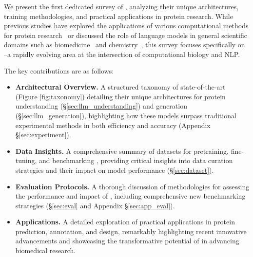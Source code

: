 We present the first dedicated survey of \proteinllms, analyzing their unique architectures, training methodologies, and practical applications in protein research. While previous studies have explored the applications of various computational methods for protein research~\cite{xinhui2024generative, wu2022survey} or discussed the role of language models in general scientific domains such as biomedicine~\cite{wang2023pre} and chemistry~\cite{liao2024words}, this survey focuses specifically on \proteinllms--a rapidly evolving area at the intersection of computational biology and NLP.  

The key contributions are as follows:


\begin{itemize}[leftmargin=1em, noitemsep, topsep=0pt]
    \item \textbf{Architectural Overview.} A structured taxonomy of state-of-the-art \proteinllms (Figure \ref{fig:taxonomy}) detailing their unique architectures for protein understanding (\S\ref{sec:llm_understanding}) and generation (\S\ref{sec:llm_generation}), highlighting how these models surpass traditional experimental methods in both efficiency and accuracy (Appendix \S\ref{sec:experiment}). 
    \item \textbf{Data Insights.} A comprehensive summary of datasets for pretraining, fine-tuning, and benchmarking \proteinllms, providing critical insights into data curation strategies and their impact on model performance (\S\ref{sec:dataset}).
    \item \textbf{Evaluation Protocols.} A thorough discussion of methodologies for assessing the performance and impact of \proteinllms, including comprehensive new benchmarking strategies (\S\ref{sec:eval} and Appendix \S\ref{sec:app_eval}).
    \item \textbf{Applications.} A detailed exploration of practical applications in protein prediction, annotation, and design, remarkably highlighting recent innovative advancements and showcasing the transformative potential of \proteinllms in advancing biomedical research.
\end{itemize}
